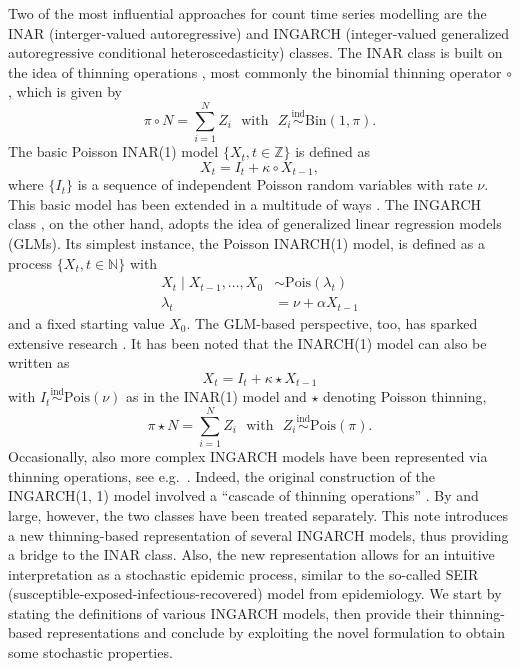 \documentclass{article}
\begin{document}
Two of the most influential approaches for count time series modelling are the INAR (interger-valued autoregressive) and INGARCH (integer-valued generalized autoregressive conditional heteroscedasticity) classes. The INAR class is built on the idea of thinning operations \citep{Steutel1979}, most commonly the binomial thinning operator $\circ$, which is given by
$$
\pi \circ N = \sum_{i = 1}^N Z_i \ \ \ \text{with} \ \ \ Z_i \stackrel{\text{ind}}{\sim} \text{Bin}(1, \pi).
$$
The basic Poisson INAR(1) model $\{X_t, t \in \mathbb{Z}\}$ \citep{McKenzie1985, Al-Osh1987} is defined as
$$
X_t = I_t + \kappa \circ X_{t - 1},
$$
where $\{I_t\}$ is a sequence of independent Poisson random variables with rate $\nu$. This basic model has been extended in a multitude of ways \cite{Scotto2015}. The INGARCH class \cite{Ferland2006, Fokianos2009}, on the other hand, adopts the idea of generalized linear regression models (GLMs). Its simplest instance, the Poisson INARCH(1) model, is defined as a process $\{X_t, t \in \mathbb{N}\}$ with
\begin{align*}
X_t \mid X_{t - 1}, \dots, X_0 & \sim \text{Pois}(\lambda_t)\\
\lambda_t & = \nu + \alpha X_{t - 1}
\end{align*}
and a fixed starting value $X_0$. The GLM-based perspective, too, has sparked extensive research \citep{Fokianos2016}. It has been noted that the INARCH(1) model can also be written as \citep{Weiss2015}
$$
X_t = I_t + \kappa \star X_{t- 1}
$$
with $I_t \stackrel{\text{ind}}{\sim} \text{Pois}(\nu)$ as in the INAR(1) model and $\star$ denoting Poisson thinning,
$$
\pi \star N = \sum_{i = 1}^N Z_i \ \ \ \text{with} \ \ \ Z_i \stackrel{\text{ind}}{\sim} \text{Pois}(\pi).
$$
Occasionally, also more complex INGARCH models have been represented via thinning operations, see e.g.\ \citep{Lu2021}. Indeed, the original construction of the INGARCH(1, 1) model involved a ``cascade of thinning operations'' \citep[p.927]{Ferland2006}. By and large, however, the two classes have been treated separately. This note introduces a new thinning-based representation of several INGARCH models, thus providing a bridge to the INAR class. Also, the new representation allows for an intuitive interpretation as a stochastic epidemic process, similar to the so-called SEIR (susceptible-exposed-infectious-recovered) model from epidemiology. We start by stating the definitions of various INGARCH models, then provide their thinning-based representations and conclude by exploiting the novel formulation to obtain some stochastic properties.
 
\end{document}
